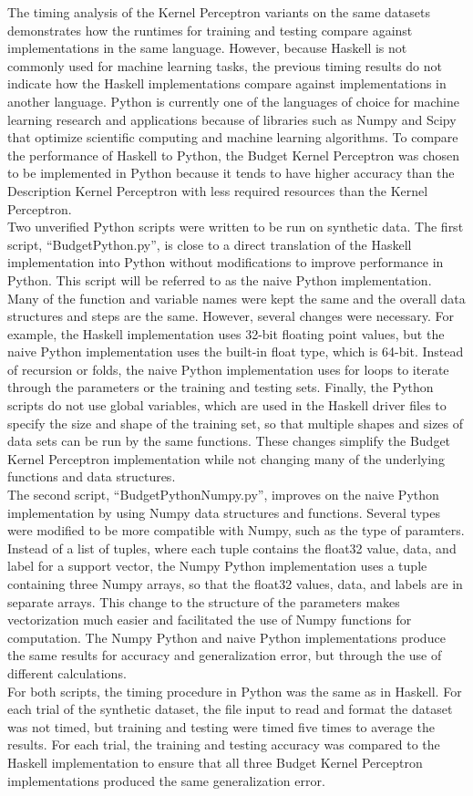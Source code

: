 The timing analysis of the Kernel Perceptron variants on the same datasets demonstrates how the runtimes for training and testing compare against implementations in the same language. However, because Haskell is not commonly used for machine learning tasks, the previous timing results do not indicate how the Haskell implementations compare against implementations in another language. Python is currently one of the languages of choice for machine learning research and applications because of libraries such as Numpy and Scipy that optimize scientific computing and machine learning algorithms. To compare the performance of Haskell to Python, the Budget Kernel Perceptron was chosen to be implemented in Python because it tends to have higher accuracy than the Description Kernel Perceptron with less required resources than the Kernel Perceptron. 
\\Two unverified Python scripts were written to be run on synthetic data. The first script, ``BudgetPython.py'', is close to a direct translation of the Haskell implementation into Python without modifications to improve performance in Python. This script will be referred to as the naive Python implementation. Many of the function and variable names were kept the same and the overall data structures and steps are the same. However, several changes were necessary. For example, the Haskell implementation uses 32-bit floating point values, but the naive Python implementation uses the built-in float type, which is 64-bit. Instead of recursion or folds, the naive Python implementation uses for loops to iterate through the parameters or the training and testing sets. Finally, the Python scripts do not use global variables, which are used in the Haskell driver files to specify the size and shape of the training set, so that multiple shapes and sizes of data sets can be run by the same functions. These changes simplify the Budget Kernel Perceptron implementation while not changing many of the underlying functions and data structures.
\\The second script, ``BudgetPythonNumpy.py'', improves on the naive Python implementation by using Numpy data structures and functions. Several types were modified to be more compatible with Numpy, such as the type of paramters. Instead of a list of tuples, where each tuple contains the float32 value, data, and label for a support vector, the Numpy Python implementation uses a tuple containing three Numpy arrays, so that the float32 values, data, and labels are in separate arrays. This change to the structure of the parameters makes vectorization much easier and facilitated the use of Numpy functions for computation. The Numpy Python and naive Python implementations produce the same results for accuracy and generalization error, but through the use of different calculations.
\\For both scripts, the timing procedure in Python was the same as in Haskell. For each trial of the synthetic dataset, the file input to read and format the dataset was not timed, but training and testing were timed five times to average the results. For each trial, the training and testing accuracy was compared to the Haskell implementation to ensure that all three Budget Kernel Perceptron implementations produced the same generalization error.

